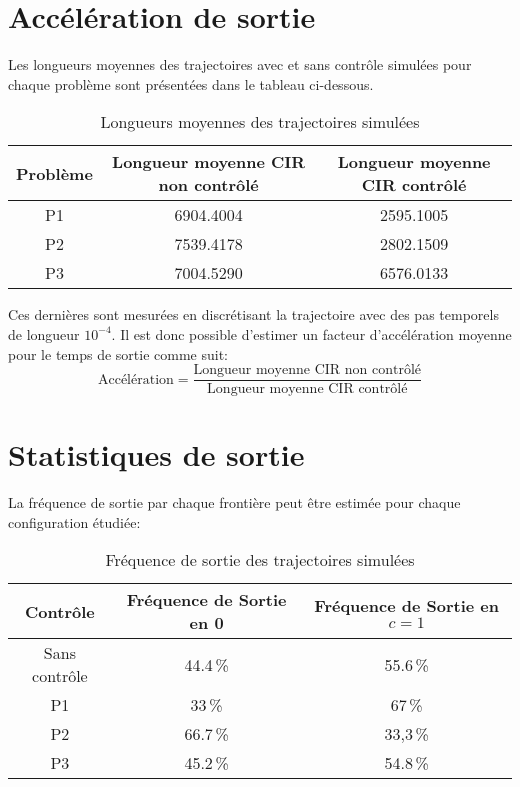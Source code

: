\section*{Accélération de sortie}
Les longueurs moyennes des trajectoires avec et sans contrôle simulées pour chaque problème sont présentées dans le tableau ci-dessous.
\begin{table}[htb]
        \centering
        \caption{Longueurs moyennes des trajectoires simulées}\label{tab:simulation_lengths}
        \renewcommand{\arraystretch}{1.4}
        \begin{tabular}{||c|c|c||}
        \hline
        Problème &
        Longueur moyenne CIR non contrôlé &
        Longueur moyenne CIR contrôlé \\
        \hline\hline
        P1 & 6904.4004 & 2595.1005 \\
        P2 & 7539.4178 & 2802.1509 \\
        P3 & 7004.5290 & 6576.0133 \\
        \hline
        \end{tabular}
\end{table}\FloatBarrier Ces dernières sont mesurées en discrétisant la trajectoire avec des pas temporels de longueur $10^{-4}$. Il est donc possible d'estimer un facteur d'accélération moyenne pour le temps de sortie comme suit: 
\[
\text{Accélération}=\frac{\text{Longueur moyenne CIR non contrôlé}}{\text{Longueur moyenne CIR contrôlé}}
\]

\section*{Statistiques de sortie}
La fréquence de sortie par chaque frontière peut être estimée pour chaque configuration étudiée:
\begin{table}[htb]
    \centering
    \caption{Fréquence de sortie des trajectoires simulées}\label{tab:simulation_exit_frequency}
    \renewcommand{\arraystretch}{1.4}
    \begin{tabular}{||c|c|c||}
        \hline
        Contrôle & Fréquence de Sortie en 0 & Fréquence de Sortie en $c=1$ \\
        \hline\hline
        Sans contrôle & 44.4\,\% & 55.6\,\% \\
        P1 & 33\,\% & 67\,\% \\
        P2 & 66.7\,\% & 33,3\,\% \\
        P3 & 45.2\,\% & 54.8\,\% \\
        \hline
    \end{tabular}
\end{table}